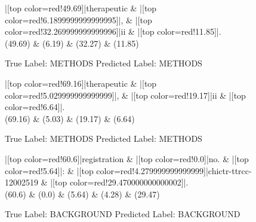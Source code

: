 \documentclass[a4paper, landscape]{article}
\begin{document}
\clearpage
\begin{figure}
\begin{center}
\begin{dependency}
\begin{deptext}
|[top color=red!49.69]|therapeutic \& |[top color=red!6.1899999999999995]|, \& |[top color=red!32.269999999999996]|ii \& |[top color=red!11.85]|.\\
(49.69) \& (6.19) \& (32.27) \& (11.85)\\
\end{deptext}
\end{dependency}
\end{center}
\caption{True Label: METHODS Predicted Label: METHODS}
\end{figure}
\clearpage
\begin{figure}
\begin{center}
\begin{dependency}
\begin{deptext}
|[top color=red!69.16]|therapeutic \& |[top color=red!5.029999999999999]|, \& |[top color=red!19.17]|ii \& |[top color=red!6.64]|.\\
(69.16) \& (5.03) \& (19.17) \& (6.64)\\
\end{deptext}
\end{dependency}
\end{center}
\caption{True Label: METHODS Predicted Label: METHODS}
\end{figure}
\clearpage
\begin{figure}
\begin{center}
\begin{dependency}
\begin{deptext}
|[top color=red!60.6]|registration \& |[top color=red!0.0]|no. \& |[top color=red!5.64]|: \& |[top color=red!4.279999999999999]|chictr-ttrcc-12002519 \& |[top color=red!29.470000000000002]|.\\
(60.6) \& (0.0) \& (5.64) \& (4.28) \& (29.47)\\
\end{deptext}
\end{dependency}
\end{center}
\caption{True Label: BACKGROUND Predicted Label: BACKGROUND}
\end{figure}
\end{document}

